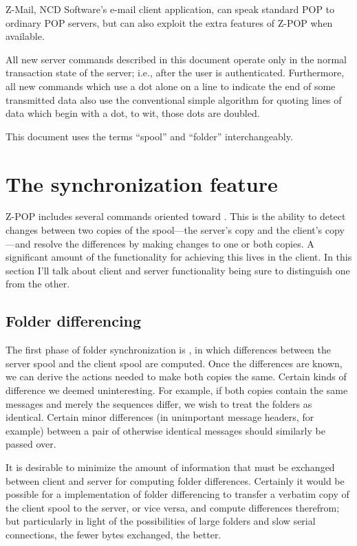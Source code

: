 Z-Mail, NCD Software's e-mail client application, can speak standard
POP to ordinary POP servers, but can also exploit the extra features
of Z-POP when available.

All new server commands described in this document operate only in the
normal transaction state of the server; i.e., after the user is
authenticated.  Furthermore, all new commands which use a dot alone on
a line to indicate the end of some transmitted data also use the
conventional simple algorithm for quoting lines of data which begin
with a dot, to wit, those dots are doubled.

This document uses the terms ``spool'' and ``folder''
interchangeably.

\section{The synchronization feature}

Z-POP includes several commands oriented toward .  This is the ability to detect changes between two
copies of the spool---the server's copy and the client's copy---and
resolve the differences by making changes to one or both copies.  A
significant amount of the functionality for achieving this lives in
the client.  In this section I'll talk about client and server
functionality being sure to distinguish one from the other.

\subsection{Folder differencing}

The first phase of folder synchronization is , in which differences between the server spool and the
client spool are computed.  Once the differences are known, we can
derive the actions needed to make both copies the same.  Certain kinds
of difference we deemed uninteresting.  For example, if both copies
contain the same messages and merely the sequences differ, we wish to
treat the folders as identical.  Certain minor differences (in
unimportant message headers, for example) between a pair of otherwise
identical messages should similarly be passed over.

It is desirable to minimize the amount of information that must be
exchanged between client and server for computing folder differences.
Certainly it would be possible for a \naive{} implementation of folder
differencing to transfer a verbatim copy of the client spool to the
server, or vice versa, and compute differences therefrom; but
particularly in light of the possibilities of large folders and slow
serial connections, the fewer bytes exchanged, the better.

